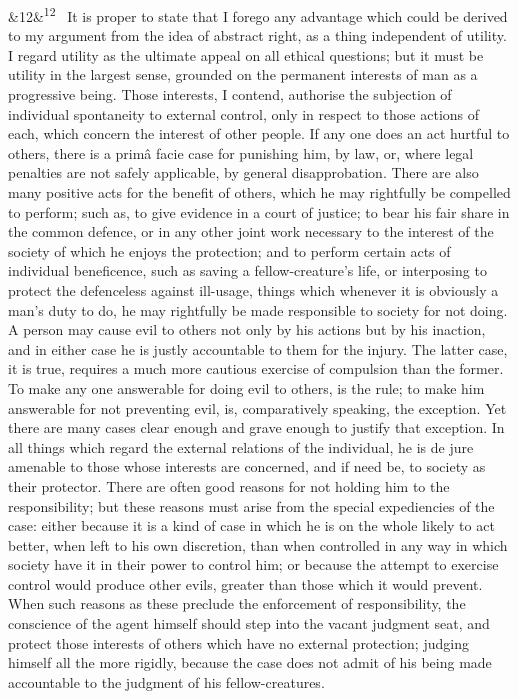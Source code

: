 \documentclass[12pt]{article}
\newcommand{\para}[1][]{\par\noindent\ifx&#1&\else\textsuperscript{\footnotesize #1}~\fi}
\begin{document}
\para[12] It is proper to state that I forego any advantage which could be derived to my argument from the idea of abstract right, as a thing independent of utility. I regard utility as the ultimate appeal on all ethical questions; but it must be utility in the largest sense, grounded on the permanent interests of man as a progressive being. Those interests, I contend, authorise the subjection of individual spontaneity to external control, only in respect to those actions of each, which concern the interest of other people. If any one does an act hurtful to others, there is a primâ facie case for punishing him, by law, or, where legal penalties are not safely applicable, by general disapprobation. There are also many positive acts for the benefit of others, which he may rightfully be compelled to perform; such as, to give evidence in a court of justice; to bear his fair share in the common defence, or in any other joint work necessary to the interest of the society of which he enjoys the protection; and to perform certain acts of individual beneficence, such as saving a fellow-creature's life, or interposing to protect the defenceless against ill-usage, things which whenever it is obviously a man's duty to do, he may rightfully be made responsible to society for not doing. A person may cause evil to others not only by his actions but by his inaction, and in either case he is justly accountable to them for the injury. The latter case, it is true, requires a much more cautious exercise of compulsion than the former. To make any one answerable for doing evil to others, is the rule; to make him answerable for not preventing evil, is, comparatively speaking, the exception. Yet there are many cases clear enough and grave enough to justify that exception. In all things which regard the external relations of the individual, he is de jure amenable to those whose interests are concerned, and if need be, to society as their protector. There are often good reasons for not holding him to the responsibility; but these reasons must arise from the special expediencies of the case: either because it is a kind of case in which he is on the whole likely to act better, when left to his own discretion, than when controlled in any way in which society have it in their power to control him; or because the attempt to exercise control would produce other evils, greater than those which it would prevent. When such reasons as these preclude the enforcement of responsibility, the conscience of the agent himself should step into the vacant judgment seat, and protect those interests of others which have no external protection; judging himself all the more rigidly, because the case does not admit of his being made accountable to the judgment of his fellow-creatures.
\end{document}
